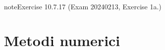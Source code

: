 \documentclass[letterpaper,10pt,italian]{jupyterBook}
\begin{document}
\begin{sphinxadmonition}{note}{Exercise 10.7.17 (Exam 2024\sphinxhyphen{}02\sphinxhyphen{}13, Exercise 1a.)}



\begin{figure}[htbp]
\centering

\noindent{}
\end{figure}
\end{sphinxadmonition}

\sphinxstepscope


\part{Metodi numerici}

\sphinxstepscope
\end{document}
